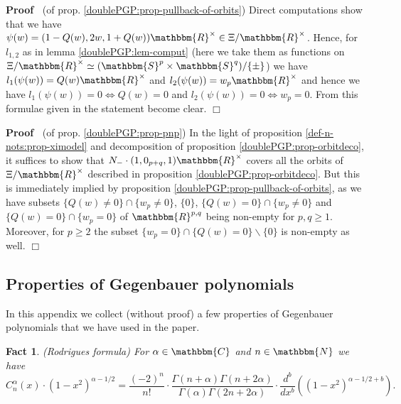 \documentclass{article}
\renewenvironment{proof}{\noindent\textbf{Proof\ }}{\hspace*{\fill}$\Box$\medskip}
\newtheorem{fact}[proposition]{Fact}
\theoremstyle{remark}
\begin{document}
\begin{proof}
  (of prop. \ref{doublePGP:prop-pullback-of-orbits}) Direct computations show
  that we have $\psi (w) = (1 - Q (w), 2 w, 1 + Q (w)) \mathbbm{R}^{\times}
  \in \Xi /\mathbbm{R}^{\times}$. Hence, for $l_{1, 2}$ as in lemma
  \ref{doublePGP:lem-comput} (here we take them as functions on $\Xi
  /\mathbbm{R}^{\times} \simeq (\mathbbm{S}^p \times \mathbbm{S}^q) / \{ \pm
  \}$) we have $l_1 (\psi (w)) = Q (w) \mathbbm{R}^{\times}$ and $l_2 (\psi
  (w)) = w_p \mathbbm{R}^{\times}$ and hence we have $l_1 (\psi (w)) = 0
  \Leftrightarrow Q (w) = 0$ and $l_2 (\psi (w)) = 0 \Leftrightarrow w_p = 0$.
  From this formulae given in the statement become clear.
\end{proof}

\begin{proof}
  (of prop. \ref{doublePGP:prop-pnp}) In the light of proposition
  \ref{def-n-nots:prop-ximodel} and decomposition of proposition
  \ref{doublePGP:prop-orbitdeco}, it suffices to show that $N_- \cdot (1, 0_{p
  + q}, 1) \mathbbm{R}^{\times}$ covers all the orbits of $\Xi
  /\mathbbm{R}^{\times}$ described in proposition
  \ref{doublePGP:prop-orbitdeco}. But this is immediately implied by
  proposition \ref{doublePGP:prop-pullback-of-orbits}, as we have subsets $\{
  Q (w) \neq 0 \} \cap \{ w_p \neq 0 \}$, $\{ 0 \}$, $\{ Q (w) = 0 \} \cap \{
  w_p \neq 0 \}$ and $\{ Q (w) = 0 \} \cap \{ w_p = 0 \}$ of $\mathbbm{R}^{p,
  q}$ being non-empty for $p, q \geqslant 1$. Moreover, for $p \geqslant 2$
  the subset $\{ w_p = 0 \} \cap \{ Q (w) = 0 \} \backslash \{ 0 \}$ is
  non-empty as well.
\end{proof}

\begin{appendices}
\section{Properties of Gegenbauer polynomials}\label{sec:gegenb}
In this appendix we collect (without proof) a few properties of Gegenbauer
polynomials that we have used in the paper.

\begin{fact}
\label{gegenb:fact-rodgigues}(Rodrigues formula) For $\alpha \in
\mathbbm{C}$ and $n \in \mathbbm{N}$ we have
\[ C^{\alpha}_n (x) \cdot (1 - x^2)^{\alpha - 1 / 2} = \frac{(- 2)^n}{n!}
   \cdot \frac{\Gamma (n + \alpha) \Gamma (n + 2 \alpha)}{\Gamma (\alpha)
   \Gamma (2 n + 2 \alpha)} \cdot \frac{d^b}{d x^b} ((1 - x^2)^{\alpha - 1 / 2
   + b}) . \]
   \end{fact}
\end{appendices}
\end{document}
